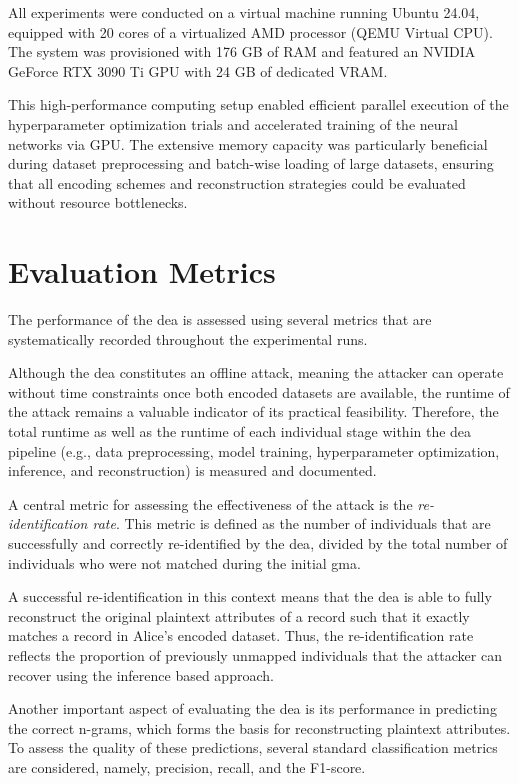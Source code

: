 All experiments were conducted on a virtual machine running Ubuntu 24.04, equipped with 20 cores of a virtualized AMD processor (QEMU Virtual CPU).
The system was provisioned with 176 GB of RAM and featured an NVIDIA GeForce RTX 3090 Ti GPU with 24 GB of dedicated VRAM.

This high-performance computing setup enabled efficient parallel execution of the hyperparameter optimization trials and accelerated training of the neural networks via GPU.
The extensive memory capacity was particularly beneficial during dataset preprocessing and batch-wise loading of large datasets, ensuring that all encoding schemes and reconstruction strategies could be evaluated without resource bottlenecks.


\section{Evaluation Metrics}  \label{sec:metrics}

The performance of the \ac{dea} is assessed using several metrics that are systematically recorded throughout the experimental runs.

Although the \ac{dea} constitutes an offline attack, meaning the attacker can operate without time constraints once both encoded datasets are available, the runtime of the attack remains a valuable indicator of its practical feasibility.
Therefore, the total runtime as well as the runtime of each individual stage within the \ac{dea} pipeline (e.g., data preprocessing, model training, hyperparameter optimization, inference, and reconstruction) is measured and documented.

A central metric for assessing the effectiveness of the attack is the \emph{re-identification rate}.
This metric is defined as the number of individuals that are successfully and correctly re-identified by the \ac{dea}, divided by the total number of individuals who were not matched during the initial \ac{gma}.

A successful re-identification in this context means that the \ac{dea} is able to fully reconstruct the original plaintext attributes of a record such that it exactly matches a record in Alice's encoded dataset.
Thus, the re-identification rate reflects the proportion of previously unmapped individuals that the attacker can recover using the inference based approach.

Another important aspect of evaluating the \ac{dea} is its performance in predicting the correct n-grams, which forms the basis for reconstructing plaintext attributes.
To assess the quality of these predictions, several standard classification metrics are considered, namely, precision, recall, and the F1-score.

